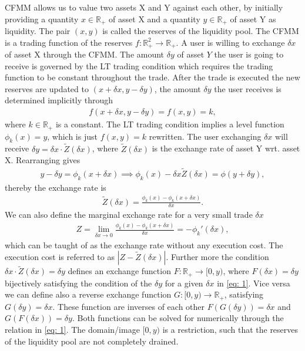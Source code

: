 CFMM allows us to value two assets X and Y against each other, by initially
providing a quantity $x \in \mathbb{R}_+$ of asset X and a quantity $y \in
\mathbb{R}_{+}$ of asset Y as liquidity. The pair $(x,y)$ is called the
reserves of the liquidity pool. The CFMM is a trading function of the
reserves $f: \mathbb{R}_+^{2} \to \mathbb{R}_+$. A user is willing to
exchange $\delta x$ of asset X through the CFMM. The amount $\delta
y$ of asset $Y$ the user is going to receive is governed by the LT trading
condition which requires the trading function to be constant throughout the
trade. After the trade is executed the new reserves are updated to
$(x+\delta x, y - \delta y)$, the amount $\delta y$ the user
receives is determined implicitly through
\begin{align}
    f(x + \delta x, y - \delta y) = f(x, y) = k, \label{eq: 1}
\end{align}
where $k \in \mathbb{R}_+$ is a constant. The LT trading condition
implies a level function $\phi_k(x) = y$, which is just $f(x,y) = k$
rewritten. The user exchanging $\delta x$ will receive $\delta y = \delta x
\cdot \tilde{Z}(\delta x)$, where $\tilde{Z}(\delta x)$ is the exchange rate
of asset Y wrt. asset X. Rearranging gives
\begin{align}
    y - \delta y = \phi_k(x + \delta x) \implies \phi_k(x) - \delta
    x\tilde{Z}(\delta x) = \phi (y + \delta y),
\end{align}
thereby the exchange rate is
\begin{align}
    \tilde{Z}(\delta x) = \frac{\phi_k(x) - \phi_k(x+\delta x)}{\delta x}.
\end{align}
We can also define the marginal exchange rate for a very small trade $\delta x$
\begin{align}
    Z = \lim_{\delta x \to 0} \frac{\phi_k(x) - \phi_k(x+\delta x)}{\delta x}
    = -\phi_k'(\delta x), \label{eq: marginal exchange rate}
\end{align}
which can be taught of as the exchange rate without any execution cost. The
execution cost is referred to as $|Z - \tilde{Z}(\delta x)|$.
\newline
Further more the condition $\delta x \cdot \tilde{Z}(\delta x) = \delta y$ defines an
exchange function $F: \mathbb{R}_+ \to [0, y)$, where $F(\delta x) =
\delta y$ bijectively satisfying the condition of the $\delta y$ for a given
$\delta x$ in \ref{eq: 1}. Vice versa we can define also a reverse exchange
function $G : [0, y) \to \mathbb{R}_+$, satisfying $G(\delta y) = \delta
x$. These function are inverses of each other $F(G(\delta y)) = \delta x$ and
$G(F(\delta x)) = \delta y$. Both functions can be solved for numerically
through the relation in \ref{eq: 1}. The domain/image $[0, y)$ is a
restriction, such that the reserves of the liquidity pool are not completely
drained.
\newline

